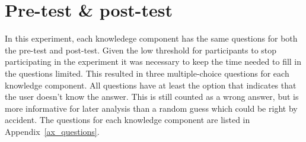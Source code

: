 \section{Pre-test \& post-test}
In this experiment, each knowledege component has the same questions for both
the pre-test and post-test. Given the low threshold for participants to stop
participating in the experiment it was necessary to keep the time needed to
fill in the questions limited. This resulted in three multiple-choice
questions for each knowledge component. All questions have at least the option that
indicates that the user doesn't know the answer. This is still counted as a
wrong answer, but is more informative for later analysis than a random guess
which could be right by accident. The questions for each knowledge component
are listed in Appendix~\ref{ax_questions}.

